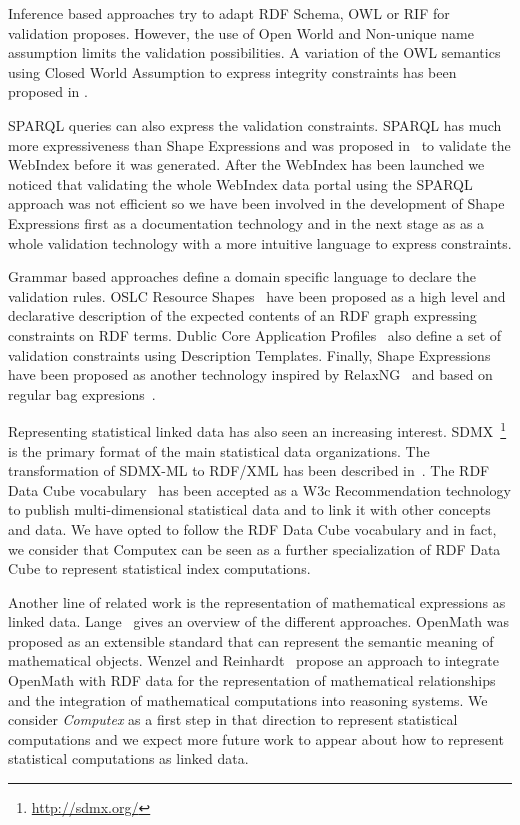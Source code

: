 \documentclass{llncs}
\begin{document}
Inference based approaches try to adapt
RDF Schema, OWL or RIF for validation proposes. 
However, the use of Open World and Non-unique name assumption limits the
validation possibilities. 
A variation of the OWL semantics using Closed World Assumption to express integrity constraints has been proposed in \cite{ClarkSirin13,Tiao10,Motik07}.

SPARQL queries can also express the validation constraints. SPARQL has much more expressiveness than Shape Expressions and was proposed in~\cite{Labra13} to validate the WebIndex before it was generated. 
After the WebIndex has been launched we noticed that validating the whole WebIndex data portal using the
SPARQL approach was not efficient so we have been involved in the development of Shape Expressions first as a documentation technology and in the next stage as as a whole validation technology with a more intuitive
language to express constraints. 

Grammar based approaches define a domain specific language to declare the validation rules. 
OSLC Resource Shapes~\cite{OSLCResourceShapes} 
have been proposed as a high level and declarative description of the expected contents of an RDF graph expressing constraints
on RDF terms. Dublic Core Application Profiles~\cite{KarenCoyleTomBaker13} also define a set of validation constraints using Description Templates. Finally, Shape Expressions have been proposed as another technology inspired by RelaxNG~\cite{RelaxNG} and based on regular bag expresions~\cite{Boneva2014}.

Representing statistical linked data has also seen an increasing interest. 
SDMX~\footnote{\url{http://sdmx.org/}} is the primary format of the main statistical data organizations. The transformation of SDMX-ML to RDF/XML has been described in~\cite{Capadisli13}.
The RDF Data Cube vocabulary~\cite{Cube} has been accepted as a W3c Recommendation technology to publish multi-dimensional statistical data and to link it with other concepts and data. 
We have opted to follow the RDF Data Cube vocabulary and in fact, we consider that Computex can be seen as a further specialization of RDF Data Cube to represent statistical index computations.

Another line of related work is the representation of mathematical expressions as linked data. 
Lange~\cite{Lange13} gives an overview of the different approaches. 
OpenMath was proposed as an extensible standard that can represent the semantic meaning of mathematical objects. 
Wenzel and Reinhardt~\cite{Wenzel12} 
propose an approach to integrate OpenMath with
RDF data for the representation of mathematical relationships and the integration
of mathematical computations into reasoning systems.
We consider \emph{Computex} as a first step in that 
direction to represent statistical computations and 
we expect more future work to appear about how to
represent statistical computations as linked data.
\end{document}
